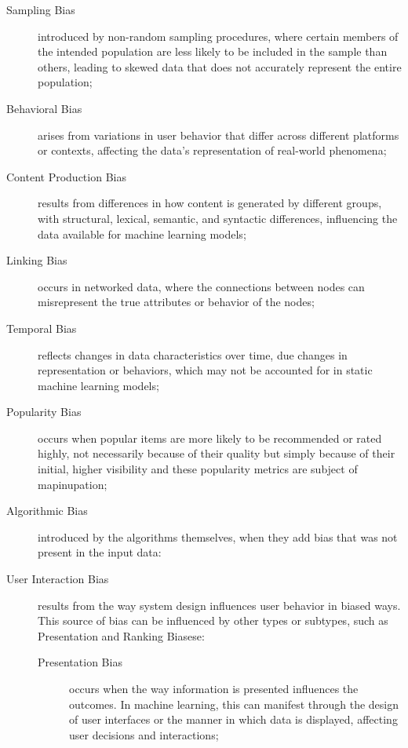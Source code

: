 \begin{description}
    \item[Sampling Bias] introduced by non-random sampling procedures, where certain members of the intended population are less likely to be included in the sample than others, leading to skewed data that does not accurately represent the entire population;
    
    \item[Behavioral Bias] arises from variations in user behavior that differ across different platforms or contexts, affecting the data's representation of real-world phenomena;

    \item[Content Production Bias] results from differences in how content is generated by different groups, with structural, lexical, semantic, and syntactic differences, influencing the data available for machine learning models; 

    \item[Linking Bias] occurs in networked data, where the connections between nodes can misrepresent the true attributes or behavior of the nodes;

    \item[Temporal Bias] reflects changes in data characteristics over time, due changes in representation or behaviors, which may not be accounted for in static machine learning models;
    
    \item[Popularity Bias] occurs when popular items are more likely to be recommended or rated highly, not necessarily because of their quality but simply because of their initial, higher visibility and these popularity metrics are subject of mapinupation;

    \item[Algorithmic Bias] introduced by the algorithms themselves, when they add bias that was not present in the input data:

    \item[User Interaction Bias] results from the way system design influences user behavior in biased ways. This source of bias can be influenced by other types or subtypes, such as Presentation and Ranking Biasese:
    \begin{description}
        \item[Presentation Bias] occurs when the way information is presented influences the outcomes. In machine learning, this can manifest through the design of user interfaces or the manner in which data is displayed, affecting user decisions and interactions;


\end{description}
\end{description}
